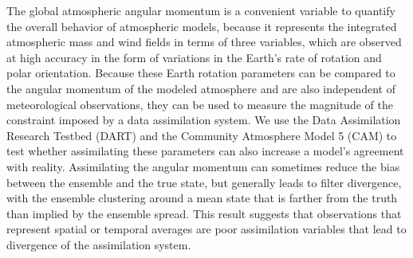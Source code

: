 The global atmospheric angular momentum is a convenient variable to quantify the overall behavior of atmospheric models, because it represents the integrated atmospheric mass and wind fields in terms of three variables, which are observed at high accuracy in the form of variations in the Earth's rate of rotation and polar orientation. 
%
Because these Earth rotation parameters can be compared to the angular momentum of the modeled atmosphere and are also independent of meteorological observations, they can be used to measure 
the magnitude of the constraint imposed by a data assimilation system.
%
We use the Data Assimilation Research Testbed (DART) and the Community Atmosphere Model 5 (CAM) to test whether assimilating these parameters can also increase a model's agreement with reality. 
Assimilating the angular momentum can sometimes reduce the bias between the ensemble and the true state, but generally leads to filter divergence, with the ensemble clustering around a mean state that is farther from the truth than implied by the ensemble spread. 
This result suggests that observations that represent spatial or temporal averages are poor assimilation variables that lead to divergence of the assimilation system.  
